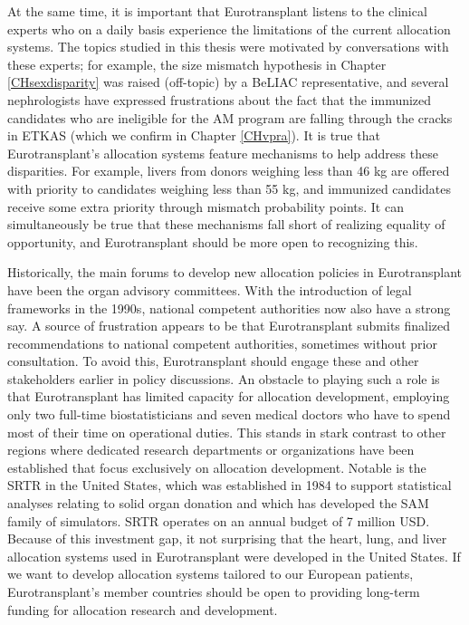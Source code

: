 \documentclass[11pt,twoside,]{book}
\begin{document}
At the same time, it is important that Eurotransplant listens to the clinical
experts who on a daily basis experience the limitations of the current allocation
systems. The topics studied in this thesis were motivated by conversations
with these experts; for example, the size mismatch hypothesis in
Chapter \ref{CHsexdisparity} was raised (off-topic) by a BeLIAC
representative, and several nephrologists have expressed frustrations about the fact
that the immunized candidates who are ineligible for the AM program are falling through the cracks
in ETKAS (which we confirm in Chapter \ref{CHvpra}). It is true that Eurotransplant's
allocation systems feature mechanisms to help address these disparities.
For example, livers from donors weighing less than 46 kg
are offered with priority to candidates weighing less than 55 kg, and immunized candidates receive some extra
priority through mismatch probability points. It can simultaneously be true that these
mechanisms fall short of realizing equality of opportunity, and Eurotransplant
should be more open to recognizing this.

Historically, the main forums to develop new allocation policies in Eurotransplant
have been the organ advisory committees. With the introduction of legal frameworks
in the 1990s, national competent authorities now also have a strong say. A source
of frustration appears to be that Eurotransplant submits finalized recommendations
to national competent authorities, sometimes without prior consultation. To avoid
this, Eurotransplant should engage these and other stakeholders earlier in policy discussions.
An obstacle to playing such a role is that Eurotransplant has limited capacity
for allocation development, employing only two full-time biostatisticians and
seven medical doctors who have to spend most of their time on operational duties.
\newpage
This stands in stark contrast to other regions where dedicated research
departments or organizations have been established that focus exclusively
on allocation development. Notable is the SRTR in the
United States, which was established in 1984 to support statistical analyses
relating to solid organ donation and which has developed the SAM family of
simulators. SRTR operates on an annual budget of 7 million USD. Because of
this investment gap, it not surprising that the heart, lung, and liver allocation systems
used in Eurotransplant were developed in the United States. If we want to
develop allocation systems tailored to our European patients, Eurotransplant's
member countries should be open to providing long-term funding for allocation
research and development.
\end{document}
